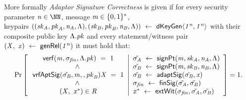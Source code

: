 \begin{definition}
    \label{def:sig:apt-sig-correctness}
    More formally \emph{Adaptor Signature Correctness} is given if for every security parameter $\varN \in \cnstNatural$, message $\mathit{m} \in \{0,1\}^{*}$, \\ keypairs
    $((\mathit{sk}_{\mathit{A}}, \mathit{pk}_{\mathit{A}}, \mathit{\mathit{n}_{\mathit{A}}}, \Lambda), (\mathit{sk}_{\mathit{B}}, \mathit{pk}_{\mathit{B}}, \mathit{\mathit{n}_{\mathit{B}}}, \Lambda)) ~\leftarrow~ \mathsf{dKeyGen}\langle \mathit{1^n}, \mathit{1^n} \rangle$
    with their composite public key $\Lambda.\mathit{pk}$
    and every statement/witness pair $(\mathit{X} ,~ \mathit{x}) ~\leftarrow~ \mathsf{genRel}(\mathit{1^n})$ it must hold that:
    \[
        \Pr\left[
        \begin{array}{c}
            \:\mathsf{verf}(\mathit{m}, \sigma_{\mathit{fin}}, \Lambda.\mathit{pk}) ~=~ 1                                         \\
            ~\land~                                                                                              \\
            \: \mathsf{vrfAptSig}(\hat{\sigma_{\mathit{B}}},\mathit{m},,\mathit{pk}_{\mathit{B}}){\mathit{X}} ~=~ 1             \\
            ~\land~                                                                                              \\
            \:(\mathit{X} ,~ \mathit{x}^*) \in \mathit{R}
        \end{array}
        \middle\vert
        \begin{array}{l}
            \tilde{\sigma_{\mathit{A}}} ~\leftarrow~ \mathsf{signPt}(\mathit{m}, \mathit{sk}_{\mathit{A}}, \mathit{\mathit{n}_{\mathit{A}}}, \Lambda)        \\
            \tilde{\sigma_{\mathit{B}}} ~\leftarrow~ \mathsf{signPt}(\mathit{m}, \mathit{sk}_{\mathit{B}}, \mathit{\mathit{n}_{\mathit{B}}}, \Lambda)              \\
            \hat{\sigma_{\mathit{B}}} ~\leftarrow~ \mathsf{adaptSig}(\tilde{\sigma_{\mathit{B}}}, \mathit{x})                                             \\
            \sigma_{\mathit{fin}} ~\leftarrow~ \mathsf{finSig}(\tilde{\sigma_{\mathit{A}}}, \tilde{\sigma_{\mathit{B}}})                                           \\
            \mathit{x}^* ~\leftarrow~ \mathsf{extWit}(\sigma_{\mathit{fin}}, \tilde{\sigma_{\mathit{A}}}, \hat{\sigma_{\mathit{B}}})
        \end{array}
        \right]=1.
    \]
\end{definition}